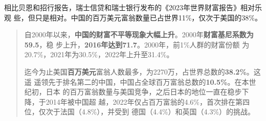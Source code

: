 相比贝恩和招行报告，瑞士信贷和瑞士银行发布的《2023年世界财富报告》相对乐观
些，但只是相对。中国的百万美元富翁数量已占世界11\%，仅次于美国的38\%。
\begin{quotation}
  自2000年以来，\textbf{中国的财富不平等现象大幅上升}。2000年\textbf{财富基尼系数为59.5}，稳
  步上升，\textbf{2016年达到71.7}。2000年，前1\%人群的财富份额
  为20.7\%，2021年为30.5\%，2022年上升至31.4\%。

  迄今为止美国\textbf{百万美元}富翁人数最多，为2270万，占世界总数的\textbf{38.2\%}。这遥
  遥领先于排名第二的中国，中国占全球百万富翁总数的\textbf{10.5\%}。在本世纪初，日本
  的百万富翁数量与美国竞争，之后日本的地位一直在稳步下降，于2014年被中国超
  越，2022年仅占百万富翁的4.6\%，首次排在第四位，仅次于法国（4.8\%），并受到
  德国（4.4\%）和英国（4.3\%）的挑战。
\end{quotation}

